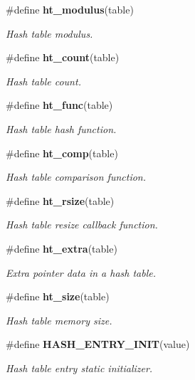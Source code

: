 \begin{CompactItemize}
\#define {\bf ht\_\-modulus}(table)
\begin{CompactList}\small\item\em Hash table modulus.\item\end{CompactList}\item 
\#define {\bf ht\_\-count}(table)
\begin{CompactList}\small\item\em Hash table count.\item\end{CompactList}\item 
\#define {\bf ht\_\-func}(table)
\begin{CompactList}\small\item\em Hash table hash function.\item\end{CompactList}\item 
\#define {\bf ht\_\-comp}(table)
\begin{CompactList}\small\item\em Hash table comparison function.\item\end{CompactList}\item 
\#define {\bf ht\_\-rsize}(table)
\begin{CompactList}\small\item\em Hash table resize callback function.\item\end{CompactList}\item 
\#define {\bf ht\_\-extra}(table)
\begin{CompactList}\small\item\em Extra pointer data in a hash table.\item\end{CompactList}\item 
\#define {\bf ht\_\-size}(table)
\begin{CompactList}\small\item\em Hash table memory size.\item\end{CompactList}\item 
\#define {\bf HASH\_\-ENTRY\_\-INIT}(value)
\begin{CompactList}\small\item\em Hash table entry static initializer.\item\end{CompactList}\item 

\end{CompactItemize}
